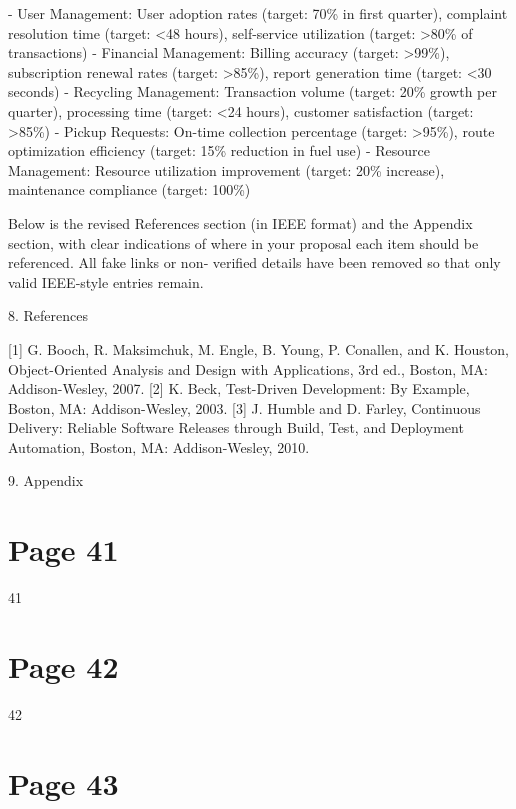 \documentclass{article}
\begin{document}
- User Management: User adoption rates (target: 70\% in first quarter), complaint resolution 
time (target: <48 hours), self-service utilization (target: >80\% of transactions) 
- Financial Management: Billing accuracy (target: >99\%), subscription renewal rates (target: 
>85\%), report generation time (target: <30 seconds) 
- Recycling Management: Transaction volume (target: 20\% growth per quarter), processing 
time (target: <24 hours), customer satisfaction (target: >85\%) 
- Pickup Requests: On-time collection percentage (target: >95\%), route optimization efficiency 
(target: 15\% reduction in fuel use) 
- Resource Management: Resource utilization improvement (target: 20\% increase), 
maintenance compliance (target: 100\%) 
 
 
 
Below is the revised References section (in IEEE format) and the Appendix section, with clear 
indications of where in your proposal each item should be referenced. All fake links or non‐
verified details have been removed so that only valid IEEE‐style entries remain. 
 
 8. References 
 
[1] G. Booch, R. Maksimchuk, M. Engle, B. Young, P. Conallen, and K. Houston, Object-Oriented 
Analysis and Design with Applications, 3rd ed., Boston, MA: Addison-Wesley, 2007. 
[2] K. Beck, Test-Driven Development: By Example, Boston, MA: Addison-Wesley, 2003. 
[3] J. Humble and D. Farley, Continuous Delivery: Reliable Software Releases through Build, Test, 
and Deployment Automation, Boston, MA: Addison-Wesley, 2010. 
 
 9. Appendix 
 

\section*{Page 41}
   
 
 41  
 
 
 


\section*{Page 42}
   
 
 42  
 


\section*{Page 43}
   
\end{document}
